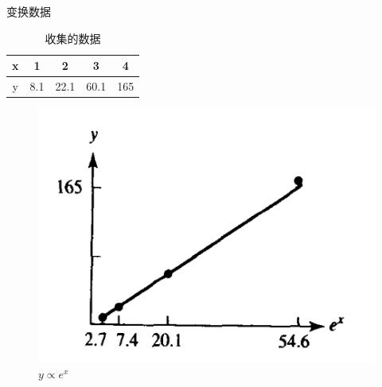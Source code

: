 \documentclass[mathserif]{beamer}
\begin{document}
\begin{frame}{变换数据}

  \begin{table}
    \centering
    \begin{tabular}{c|cccc}
      x & 1 & 2 & 3 & 4\\
      \hline{}
      y & 8.1 & 22.1 & 60.1 & 165
    \end{tabular}
    \caption{收集的数据}
  \end{table}

  \begin{figure}
    \centering
    \includegraphics[height=.4\textheight{}]{y-exp.png}
    \caption{$y \propto e^x$}
  \end{figure}
\end{frame}
\end{document}

